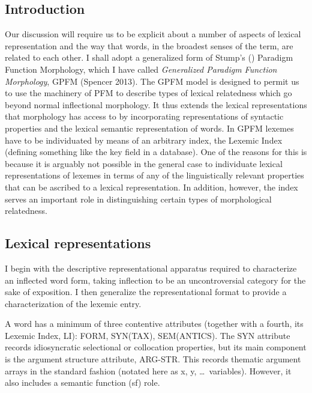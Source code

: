 \documentclass[output=paper,
modfonts
]{LSP/langsci}
\begin{document}
\subsection{Introduction}

Our discussion will require us to be explicit about a number of aspects of lexical representation and the way that words, in the broadest senses of the term, are related to each other. 
I shall adopt a generalized form of Stump’s (\citeyear*{Stump01:book}) Paradigm Function Morphology, which I have called \emph{Generalized Paradigm Function Morphology}, GPFM (Spencer 2013). The GPFM model is designed to permit us to use the machinery of PFM to describe types of lexical relatedness which go beyond normal inflectional morphology. It thus extends the lexical representations that morphology has access to by incorporating representations of syntactic properties and the lexical semantic representation of words. In GPFM lexemes have to be individuated by means of an arbitrary index, the Lexemic Index (defining something like the key field in a database). One of the reasons for this is because it is arguably not possible in the general case to individuate lexical representations of lexemes in terms of any of the linguistically relevant properties that can be ascribed to a lexical representation. In addition, however, the index serves an important role in distinguishing certain types of morphological relatedness.%


\subsection{Lexical representations}	\label{sec:lexrep}

I begin with the descriptive representational  apparatus required to characterize an inflected word form, taking inflection to be an uncontroversial category for the sake of exposition. I then generalize the representational format to provide a characterization of the lexemic entry.

A word has a minimum of three contentive attributes (together with a fourth, its Lexemic Index, LI): FORM, SYN(TAX), SEM(ANTICS). %
The SYN attribute records idiosyncratic selectional or collocation properties, but its main component is the  argument structure attribute, ARG-STR. This records thematic argument arrays in the standard fashion (notated here as x, y, \ldots\ variables). However, it also includes a semantic function (sf) role. 
\end{document}
